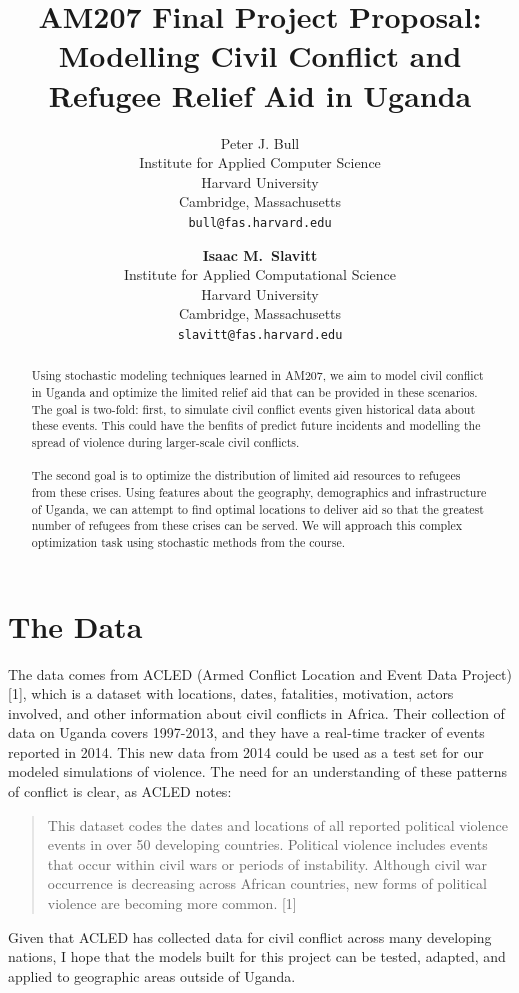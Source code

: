 \documentclass{article} %
\title{AM207 Final Project Proposal: Modelling Civil Conflict and Refugee Relief Aid in Uganda}
\author{
Peter J. Bull\\
Institute for Applied Computer Science\\
Harvard University\\
Cambridge, Massachusetts \\
\texttt{bull@fas.harvard.edu} \\
\and
\textbf{Isaac M.~Slavitt}\\
Institute for Applied Computational Science\\
Harvard University\\
Cambridge, Massachusetts\\
\texttt{slavitt@fas.harvard.edu} \\
}
\begin{document}
\maketitle

\begin{abstract}
Using stochastic modeling techniques learned in AM207, we aim to model civil conflict in Uganda and
optimize the limited relief aid that can be provided in these scenarios. The goal is two-fold: first, 
to simulate civil conflict events given historical data about these events. This could have the benfits
of predict future incidents and modelling the spread of violence during larger-scale civil conflicts. \\
\\
The second goal is to optimize the distribution of limited aid resources to refugees from these crises. Using
features about the geography, demographics and infrastructure of Uganda, we can attempt to find optimal locations
to deliver aid so that the greatest number of refugees from these crises can be served. We will approach this
complex optimization task using stochastic methods from the course.
\end{abstract}

\section{The Data}

The data comes from ACLED (Armed Conflict Location and Event Data Project) [1], which is a dataset with locations, dates, fatalities, motivation, actors involved, and other information about civil conflicts in Africa. Their collection of data on Uganda covers 1997-2013, and they have a real-time tracker of events reported in 2014. This new data from 2014 could be used as a test set for our modeled simulations of violence. The need for an understanding of these patterns of conflict is clear, as ACLED notes:
\begin{quote}
This dataset codes the dates and locations of all reported political violence events in over 50 developing countries. Political violence includes events that occur within civil wars or periods of instability. Although civil war occurrence is decreasing across African countries, new forms of political violence are becoming more common.  [1]
\end{quote}
Given that ACLED has collected data for civil conflict across many developing nations, I hope that the models built for this project can be tested, adapted, and applied to geographic areas outside of Uganda.
\end{document}
